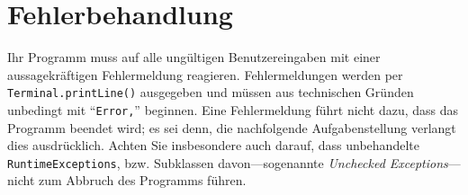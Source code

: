 \section*{Fehlerbehandlung}
Ihr Programm muss auf alle ungültigen Benutzereingaben mit einer aussagekräftigen Fehlermeldung reagieren. 
Fehlermeldungen werden per \texttt{Terminal.printLine()} ausgegeben und müssen aus technischen Gründen unbedingt mit "`\texttt{Error,}"'  beginnen.
Eine Fehlermeldung führt nicht dazu, dass das Programm beendet wird; es sei denn, die nachfolgende Aufgabenstellung verlangt dies ausdrücklich.
Achten Sie insbesondere auch darauf, dass unbehandelte
\texttt{RuntimeExceptions}, bzw. Subklassen davon---sogenannte \emph{Unchecked Exceptions}---nicht zum Abbruch des Programms führen.
